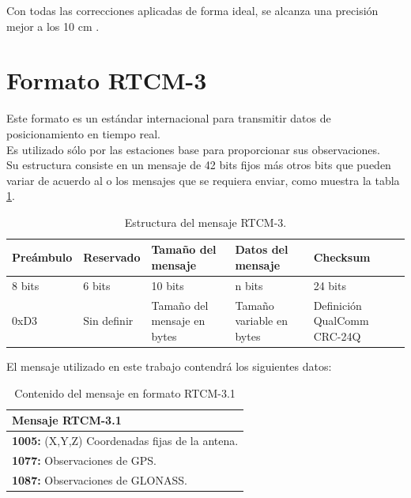 Con todas las correcciones aplicadas de forma ideal, se alcanza una precisión mejor a los 10 cm \cite{cerrato2011diseno}.

\section{Formato RTCM-3}

Este formato es un estándar internacional para transmitir datos de posicionamiento en tiempo real. \\

Es utilizado sólo por las estaciones base para proporcionar sus observaciones. \\

Su estructura consiste en un mensaje de 42 bits fijos más otros bits que pueden variar de acuerdo al o los mensajes que se requiera enviar, como muestra la tabla \ref{Tab:RTCM-Struct}\cite{rubinov2011review}.\\

\begin{table}[!htb]
\begin{center}
\caption{Estructura del mensaje RTCM-3.}
\label{Tab:RTCM-Struct}
\begin{tabular}{|l|l|l|l|l|}
	\hline
	\textbf{Preámbulo} & \textbf{Reservado} & \textbf{\small Tamaño del mensaje} & \textbf{\small Datos del mensaje} & \textbf{Checksum}\\
	\hline
	8 bits & 6 bits & 10 bits & n bits & 24 bits \\
	\hline
	0xD3 & \parbox[t]{1.9cm}{Sin definir} & \parbox[t]{2.9cm}{Tamaño del mensaje en bytes} & \parbox[t]{2.9cm}{Tamaño variable en bytes} & \parbox[t]{2.05cm}{Definición QualComm CRC-24Q}\\
	\hline
\end{tabular}
\end{center}
\end{table}

El mensaje utilizado en este trabajo contendrá los siguientes datos: \\

\begin{table}[!htb]
\begin{center}
\caption{Contenido del mensaje en formato RTCM-3.1}
\begin{tabular}{|l|}
	\hline
	\textbf{Mensaje RTCM-3.1}\\
	\hline
	\tabitem \textbf{1005:} (X,Y,Z) Coordenadas fijas de la antena. \\
	\tabitem \textbf{1077:} Observaciones de GPS. \\
	\tabitem \textbf{1087:} Observaciones de GLONASS.\footnotemark \\
	\hline
\end{tabular}
\end{center}
\end{table}

